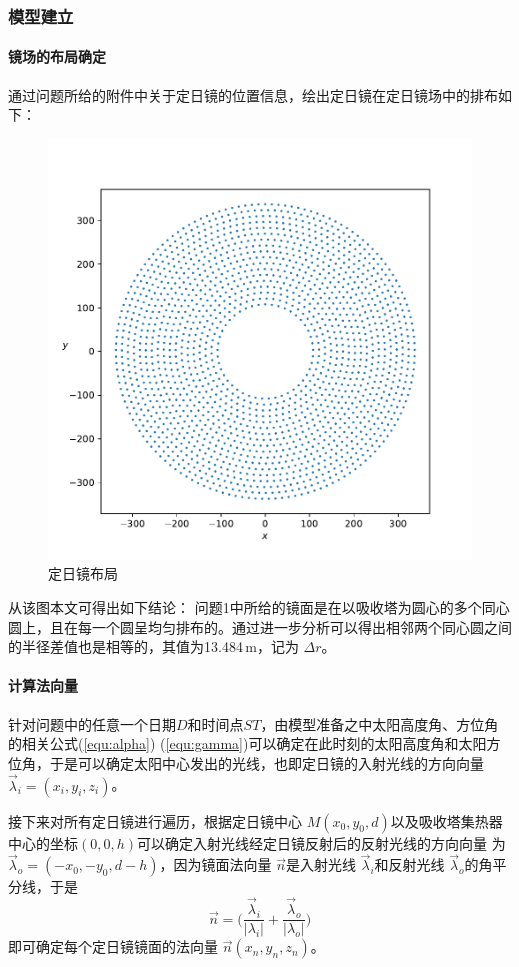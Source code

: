 \documentclass[../main.tex]{subfiles}
\begin{document}
\subsubsection{模型建立}
\paragraph{镜场的布局确定} 通过问题所给的附件中关于定日镜的位置信息，绘出定日镜在定日镜场中的排布如下：
%
\begin{figure}[H]
\centering
\includegraphics[scale = 0.5]{arange_1.pdf}
\caption{\kaishu 定日镜布局}\label{arange_1}
\end{figure}
%
从该图本文可得出如下结论：
问题1中所给的镜面是在以吸收塔为圆心的多个同心圆上，且在每一个圆呈均匀排布的。通过进一步分析可以得出相邻两个同心圆之间的半径差值也是相等的，其值为13.484\(\,\mathrm{m}\)，记为 \(\Delta r\)。
\paragraph{计算法向量}
针对问题中的任意一个日期\(D\)和时间点\(ST\)，由模型准备之中太阳高度角、方位角的相关公式(\ref{equ:alpha}) (\ref{equ:gamma})可以确定在此时刻的太阳高度角和太阳方位角，于是可以确定太阳中心发出的光线，也即定日镜的入射光线的方向向量\(\vec \lambda_i=(x_i,y_i,z_i)\)。

接下来对所有定日镜进行遍历，根据定日镜中心
\(M(x_0,y_0,d)\)以及吸收塔集热器中心的坐标\((0,0,h)\)可以确定入射光线经定日镜反射后的反射光线的方向向量
为 \(\vec \lambda_o  = (−x_0,−y_0, d −h)\)，因为镜面法向量 \(\vec n\)是入射光线 \(\vec \lambda _{i}\)和反射光线 \(\vec \lambda _{o}\)的角平分线，于是
\begin{equation}
\vec n = \big(\frac{\vec \lambda_{i}}{\vert \lambda_{i} \vert} + \frac{\vec \lambda_{o}}{\vert \lambda_{o} \vert}\big)
\end{equation}
即可确定每个定日镜镜面的法向量 \(\vec n (x_{n}, y_{n}, z_{n})\)。
\end{document}
